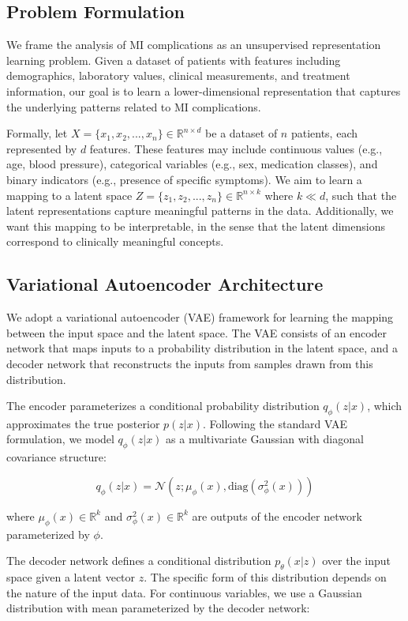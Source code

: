 \documentclass[oupdraft]{bio}
\begin{document}
\subsection{Problem Formulation}

We frame the analysis of MI complications as an unsupervised representation learning problem. Given a dataset of patients with features including demographics, laboratory values, clinical measurements, and treatment information, our goal is to learn a lower-dimensional representation that captures the underlying patterns related to MI complications.

Formally, let $X = \{x_1, x_2, ..., x_n\} \in \mathbb{R}^{n \times d}$ be a dataset of $n$ patients, each represented by $d$ features. These features may include continuous values (e.g., age, blood pressure), categorical variables (e.g., sex, medication classes), and binary indicators (e.g., presence of specific symptoms). We aim to learn a mapping to a latent space $Z = \{z_1, z_2, ..., z_n\} \in \mathbb{R}^{n \times k}$ where $k \ll d$, such that the latent representations capture meaningful patterns in the data. Additionally, we want this mapping to be interpretable, in the sense that the latent dimensions correspond to clinically meaningful concepts.

\subsection{Variational Autoencoder Architecture}

We adopt a variational autoencoder (VAE) framework for learning the mapping between the input space and the latent space. The VAE consists of an encoder network that maps inputs to a probability distribution in the latent space, and a decoder network that reconstructs the inputs from samples drawn from this distribution.

The encoder parameterizes a conditional probability distribution $q_\phi(z|x)$, which approximates the true posterior $p(z|x)$. Following the standard VAE formulation, we model $q_\phi(z|x)$ as a multivariate Gaussian with diagonal covariance structure:

$$q_\phi(z|x) = \mathcal{N}(z; \mu_\phi(x), \text{diag}(\sigma^2_\phi(x)))$$

where $\mu_\phi(x) \in \mathbb{R}^k$ and $\sigma^2_\phi(x) \in \mathbb{R}^k$ are outputs of the encoder network parameterized by $\phi$.

The decoder network defines a conditional distribution $p_\theta(x|z)$ over the input space given a latent vector $z$. The specific form of this distribution depends on the nature of the input data. For continuous variables, we use a Gaussian distribution with mean parameterized by the decoder network:
\end{document}
